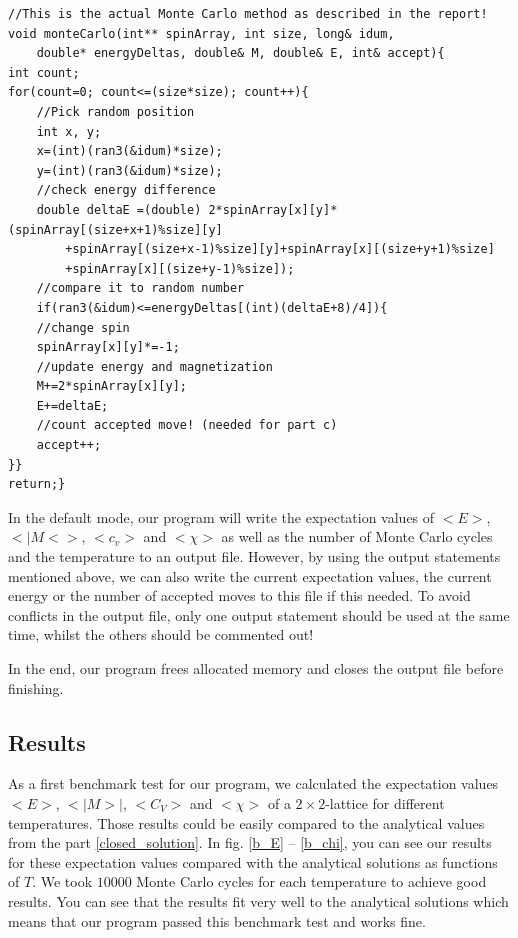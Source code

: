 \documentclass[10pt,a4paper]{article}
\begin{document}
\begin{lstlisting}
//This is the actual Monte Carlo method as described in the report!
void monteCarlo(int** spinArray, int size, long& idum,
	double* energyDeltas, double& M, double& E, int& accept){
int count;
for(count=0; count<=(size*size); count++){
	//Pick random position
	int x, y;
	x=(int)(ran3(&idum)*size);
	y=(int)(ran3(&idum)*size);
	//check energy difference
	double deltaE =(double) 2*spinArray[x][y]*(spinArray[(size+x+1)%size][y]
		+spinArray[(size+x-1)%size][y]+spinArray[x][(size+y+1)%size]
		+spinArray[x][(size+y-1)%size]);
	//compare it to random number
	if(ran3(&idum)<=energyDeltas[(int)(deltaE+8)/4]){
	//change spin
	spinArray[x][y]*=-1;
	//update energy and magnetization
	M+=2*spinArray[x][y];
	E+=deltaE;
	//count accepted move! (needed for part c)
	accept++;
}}
return;}
\end{lstlisting}

In the default mode, our program will write the expectation values of $<E>$, $<|M<>$, $<c_v>$ and $<\chi>$ as well as the number of Monte Carlo cycles and the temperature to an output file. However, by using the output statements mentioned above, we can also write the current expectation values, the current energy or the number of accepted moves to this file if this needed. To avoid conflicts in the output file, only one output statement should be used at the same time, whilst the others should be commented out!

In the end, our program frees allocated memory and closes the output file before finishing.

\subsection{Results}
As a first benchmark test for our program, we calculated the expectation values $<E>$, $<|M>|$, $<C_V>$ and $<\chi>$ of a $2\times2$-lattice for different temperatures. Those results could be easily compared to the analytical values from the part \ref{closed_solution}. In fig. \ref{b_E} -- \ref{b_chi}, you can see our results for these expectation values compared with the analytical solutions as functions of $T$. We took $10000$ Monte Carlo cycles for each temperature to achieve good results. You can see that the results fit very well to the analytical solutions which means that our program passed this benchmark test and works fine.
\end{document}
